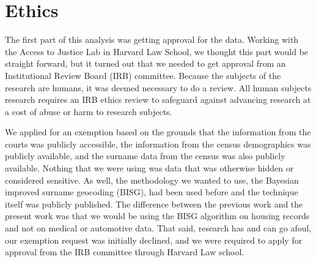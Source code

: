 \chapter{Ethics}
\label{chap:intro}

The first part of this analysis was getting approval for the data.  Working with the Access to Justice Lab in Harvard Law School, we thought this part would be straight forward, but it turned out that we needed to get approval from an Institutional Review Board (IRB) committee.  Because the subjects of the research are humans, it was deemed necessary to do a review.  All human subjects research requires an IRB ethics review to safeguard against advancing research at a cost of abuse or harm to research subjects.

\par We applied for an exemption based on the grounds that the information from the courts was publicly accessible, the information from the census demographics was publicly available, and the surname data from the census was also publicly available.  Nothing that we were using was data that was otherwise hidden or considered sensitive.  As well, the methodology we wanted to use, the Bayesian improved surname geocoding (BISG), had been used before and the technique itself was publicly published.  The difference between the previous work and the present work was that we would be using the BISG algorithm on housing records and not on medical or automotive data.  That said, research has and can go afoul, our exemption request was initially declined, and we were required to apply for approval from the IRB committee through Harvard Law school. \par

